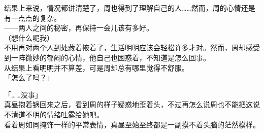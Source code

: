 结果上来说，情况都讲清楚了，周也得到了理解自己的人……然而，周的心情还是有一点点的复杂。\\

——两人之间的秘密，再保持一会儿该有多好。\\

（想什么呢我）\\

不用再对两个人到处藏着掖着了，生活明明应该会轻松许多才对。然而，周却感受到一阵微妙的郁闷的心情，他自己也困惑着，不知道是怎么回事。\\

从结果上看明明并不算差，可是周却总有哪里觉得不舒服。\\

「怎么了吗？」

「……没事」\\

真昼抱着锅回来之后，看到周的样子疑惑地歪着头，不过再怎么说周也不能把这说不清道不明的情绪吐露给她吧。\\

看着周如同掩饰一样的平常表情，真昼至始至终都是一副摸不着头脑的茫然模样。
